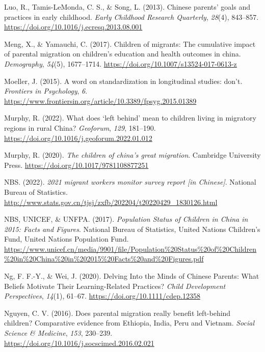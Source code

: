 \documentclass[
  man,floatsintext]{apa7}
\newlength{\cslhangindent}
\newlength{\cslentryspacingunit} %
\newenvironment{CSLReferences}[2] %
 {%
  \setlength{\parindent}{0pt}
  \ifodd #1
  \let\oldpar\par
  \def\par{\hangindent=\cslhangindent\oldpar}
  \fi
  \setlength{\parskip}{#2\cslentryspacingunit}
 }%
 {}
\begin{document}
\begin{CSLReferences}{1}{0}
\leavevmode{}%
Luo, R., Tamis-LeMonda, C. S., \& Song, L. (2013). Chinese parents{'} goals and practices in early childhood. \emph{Early Childhood Research Quarterly}, \emph{28}(4), 843--857. \url{https://doi.org/10.1016/j.ecresq.2013.08.001}

\leavevmode{}%
Meng, X., \& Yamauchi, C. (2017). Children of migrants: The cumulative impact of parental migration on children{'}s education and health outcomes in china. \emph{Demography}, \emph{54}(5), 1677--1714. \url{https://doi.org/10.1007/s13524-017-0613-z}

\leavevmode{}%
Moeller, J. (2015). A word on standardization in longitudinal studies: don't. \emph{Frontiers in Psychology}, \emph{6}. \url{https://www.frontiersin.org/article/10.3389/fpsyg.2015.01389}

\leavevmode{}%
Murphy, R. (2022). What does {`}left behind{'} mean to children living in migratory regions in rural China? \emph{Geoforum}, \emph{129}, 181--190. \url{https://doi.org/10.1016/j.geoforum.2022.01.012}

\leavevmode{}%
Murphy, R. (2020). \emph{The children of china{'}s great migration}. Cambridge University Press. \url{https://doi.org/10.1017/9781108877251}

\leavevmode{}%
NBS. (2022). \emph{2021 migrant workers monitor survey report {[}in Chinese{]}}. National Bureau of Statistics. \url{http://www.stats.gov.cn/tjsj/zxfb/202204/t20220429_1830126.html}

\leavevmode{}%
NBS, UNICEF, \& UNFPA. (2017). \emph{Population Status of Children in China in 2015: Facts and Figures}. National Bureau of Statistics, United Nations Children's Fund, United Nations Population Fund. \url{https://www.unicef.cn/media/9901/file/Population\%20Status\%20of\%20Children\%20in\%20China\%20in\%202015\%20Facts\%20and\%20Figures.pdf}

\leavevmode{}%
Ng, F. F.-Y., \& Wei, J. (2020). Delving Into the Minds of Chinese Parents: What Beliefs Motivate Their Learning-Related Practices? \emph{Child Development Perspectives}, \emph{14}(1), 61--67. \url{https://doi.org/10.1111/cdep.12358}

\leavevmode{}%
Nguyen, C. V. (2016). Does parental migration really benefit left-behind children? Comparative evidence from Ethiopia, India, Peru and Vietnam. \emph{Social Science \& Medicine}, \emph{153}, 230--239. \url{https://doi.org/10.1016/j.socscimed.2016.02.021}


\end{CSLReferences}
\end{document}
